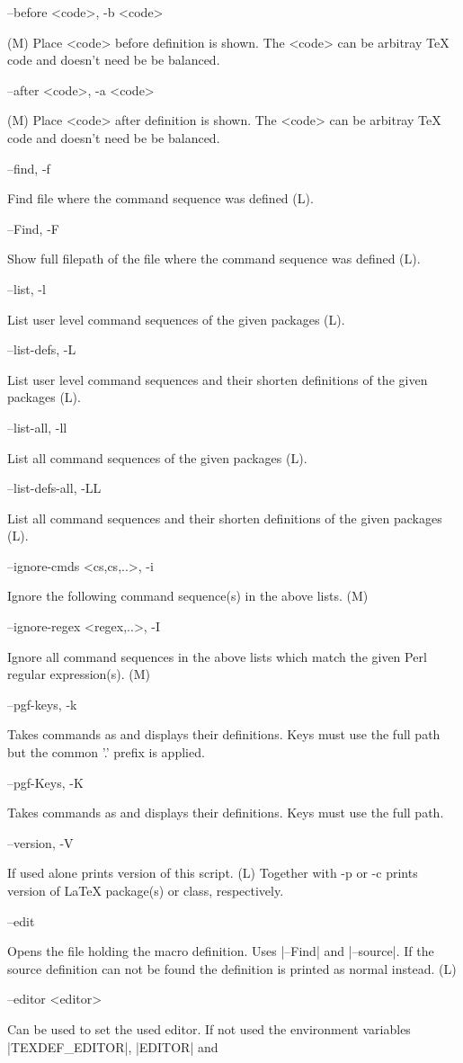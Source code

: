 \documentclass{ydoc}
\newenvironment{options}{%
    \def\cstart{\begingroup\ttfamily\par\noindent\ignorespaces}%
    \def\csep{\endgroup\begingroup\list {}{}\item \relax}%
    \def\cend{\endlist\par\medskip\endgroup\cstart}%
    \cstart
}{%
    \endgroup
}
\begin{document}
\begin{options}
  --before \MacroArgs<code>, -b \MacroArgs<code>     \csep (M) Place \MacroArgs<code> before definition is shown.
                                                       The \MacroArgs<code> can be arbitray TeX code and doesn't need be be balanced.\cend
  --after  \MacroArgs<code>, -a \MacroArgs<code>     \csep (M) Place \MacroArgs<code> after definition is shown.
                                                       The \MacroArgs<code> can be arbitray TeX code and doesn't need be be balanced.\cend
  --find, -f                                         \csep Find file where the command sequence was defined (L).\cend
  --Find, -F                                         \csep Show full filepath of the file where the command sequence was defined (L).\cend
  --list, -l                                         \csep List user level command sequences of the given packages (L).\cend
  --list-defs, -L                                    \csep List user level command sequences and their shorten definitions of the given packages (L).\cend
  --list-all, -ll                                    \csep List all command sequences of the given packages (L).\cend
  --list-defs-all, -LL                               \csep List all command sequences and their shorten definitions of the given packages (L).\cend
  --ignore-cmds \MacroArgs<cs,cs,..>,  -i            \csep Ignore the following command sequence(s) in the above lists. (M)\cend
  --ignore-regex \MacroArgs<regex,..>, -I            \csep Ignore all command sequences in the above lists which match the given Perl regular expression(s). (M)\cend
  --pgf-keys, -k                                     \csep Takes commands as  and displays their definitions. Keys must use the full path but the common '.\@cmd' prefix is applied.\cend
  --pgf-Keys, -K                                     \csep Takes commands as  and displays their definitions. Keys must use the full path.\cend
  --version, -V                                      \csep If used alone prints version of this script.
                                                       (L) Together with -p or -c prints version of LaTeX package(s) or class, respectively.\cend
  --edit                                             \csep Opens the file holding the macro definition. Uses |--Find| and |--source|.
                                                           If the source definition can not be found the definition is printed as normal instead. (L)\cend
  --editor <editor>                                  \csep Can be used to set the used editor. If not used the environment variables |TEXDEF_EDITOR|, |EDITOR| and

\end{options}
\end{document}
